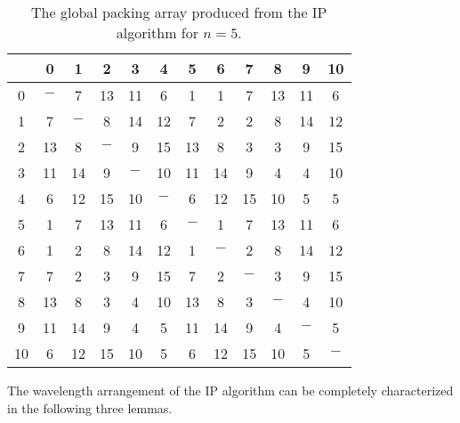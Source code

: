 \documentclass[journal,draftcls,onecolumn,12pt,twoside]{IEEEtran}
\begin{document}
\begin{table}[h]\label{tab:C11}
\scriptsize
\begin{tabular}{c|ccccccccccc}
 & 0 & 1 & 2 & 3 & 4 & 5 & 6 & 7 & 8 & 9 & 10 \\ \hline
0 & $-$ & 7 & 13 & 11 & 6 & 1 & 1 & 7 & 13 & 11 & 6 \\
1 & 7 & $-$ & 8 & 14 & 12 & 7 & 2 & 2 & 8 & 14 & 12 \\
2 & 13 & 8 & $-$ & 9 & 15 & 13 & 8 & 3 & 3 & 9 & 15 \\
3 & 11 & 14 & 9 & $-$ & 10 & 11 & 14 & 9 & 4 & 4 & 10 \\
4 & 6 & 12 & 15 & 10 & $-$ & 6 & 12 & 15 & 10 & 5 & 5 \\
5 & 1 & 7 & 13 & 11 & 6 & $-$ & 1 & 7 & 13 & 11 & 6 \\
6 & 1 & 2 & 8 & 14 & 12 & 1 & $-$ & 2 & 8 & 14 & 12 \\
7 & 7 & 2 & 3 & 9 & 15 & 7 & 2 & $-$ & 3 & 9 & 15 \\
8 & 13 & 8 & 3 & 4 & 10 & 13 & 8 & 3 & $-$ & 4 & 10 \\
9 & 11 & 14 & 9 & 4 & 5 & 11 & 14 & 9 & 4 & $-$ & 5 \\
10 & 6 & 12 & 15 & 10 & 5 & 6 & 12 & 15 & 10 & 5 & $-$ \\
\end{tabular}
\normalsize
\caption{The global packing array produced from the IP algorithm for $n=5$.}
\end{table}

The wavelength arrangement of the IP algorithm can be completely characterized in the following three lemmas.
\end{document}

